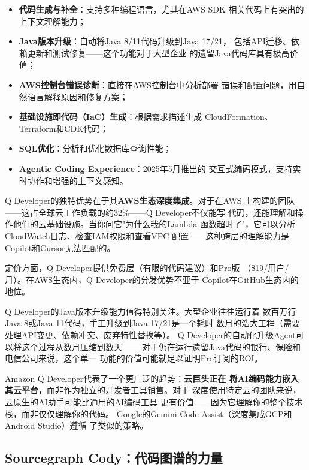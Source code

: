 \begin{itemize}
  \item \textbf{代码生成与补全}：支持多种编程语言，尤其在AWS SDK
    相关代码上有突出的上下文理解能力；
  \item \textbf{Java版本升级}：自动将Java 8/11代码升级到Java 17/21，
    包括API迁移、依赖更新和测试修复——这个功能对于大型企业
    的遗留Java代码库具有极高价值；
  \item \textbf{AWS控制台错误诊断}：直接在AWS控制台中分析部署
    错误和配置问题，用自然语言解释原因和修复方案；
  \item \textbf{基础设施即代码（IaC）生成}：根据需求描述生成
    CloudFormation、Terraform和CDK代码；
  \item \textbf{SQL优化}：分析和优化数据库查询性能；
  \item \textbf{Agentic Coding Experience}：2025年5月推出的
    交互式编码模式，支持实时协作和增强的上下文感知。
\end{itemize}

Q Developer的独特优势在于其\textbf{AWS生态深度集成}。对于在AWS
上构建的团队——这占全球云工作负载的约32\%——Q Developer不仅能写
代码，还能理解和操作他们的云基础设施。当你问它"为什么我的Lambda
函数超时了"，它可以分析CloudWatch日志、检查IAM权限和查看VPC
配置——这种跨层的理解能力是Copilot和Cursor无法匹配的。

定价方面，Q Developer提供免费层（有限的代码建议）和Pro版
（\$19/用户/月）。在AWS生态内，Q Developer的分发优势不亚于
Copilot在GitHub生态内的地位。

Q Developer的Java版本升级能力值得特别关注。大型企业往往运行着
数百万行Java 8或Java 11代码，手工升级到Java 17/21是一个耗时
数月的浩大工程（需要处理API变更、依赖冲突、废弃特性替换等）。
Q Developer的自动化升级Agent可以将这个过程从数月压缩到数天——
对于仍在运行遗留Java代码的银行、保险和电信公司来说，这个单一
功能的价值可能就足以证明Pro订阅的ROI。

Amazon Q Developer代表了一个更广泛的趋势：\textbf{云巨头正在
将AI编码能力嵌入其云平台}，而非作为独立的开发者工具销售。对于
深度使用特定云的团队来说，云原生的AI助手可能比通用的AI编码工具
更有价值——因为它理解你的整个技术栈，而非仅仅理解你的代码。
Google的Gemini Code Assist（深度集成GCP和Android Studio）遵循
了类似的策略。

\subsection{Sourcegraph Cody：代码图谱的力量}
\label{subsec:cody}

